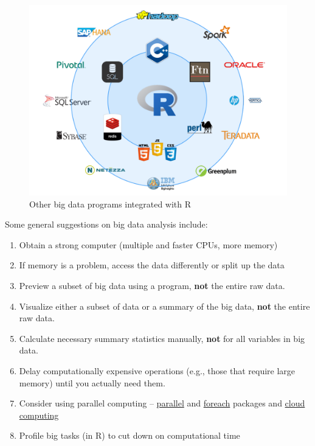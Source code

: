 \documentclass[]{book}
\begin{document}
\begin{figure}
\includegraphics[width=1\linewidth]{images/r_and_others} \caption{Other big data programs integrated with R}\label{fig:fig1-2}
\end{figure}

Some general suggestions on big data analysis include:

\begin{enumerate}
\def\labelenumi{\arabic{enumi}.}
\item
  Obtain a strong computer (multiple and faster CPUs, more memory)
\item
  If memory is a problem, access the data differently or split up the data
\item
  Preview a subset of big data using a program, \textbf{not} the entire raw data.
\item
  Visualize either a subset of data or a summary of the big data, \textbf{not} the entire raw data.
\item
  Calculate necessary summary statistics manually, \textbf{not} for all variables in big data.
\item
  Delay computationally expensive operations (e.g., those that require large memory) until you actually need them.
\item
  Consider using parallel computing -- \href{https://stat.ethz.ch/R-manual/R-devel/library/parallel/doc/parallel.pdf}{parallel} and \href{https://cran.r-project.org/web/packages/foreach/vignettes/foreach.pdf}{foreach} packages and \href{https://rstudio.cloud/}{cloud computing}
\item
  Profile big tasks (in R) to cut down on computational time
\end{enumerate}
\end{document}
